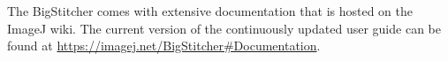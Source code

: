 
The BigStitcher comes with extensive documentation that is hosted on the ImageJ wiki. The current version of the continuously updated user guide can be found at \url{https://imagej.net/BigStitcher\#Documentation}.